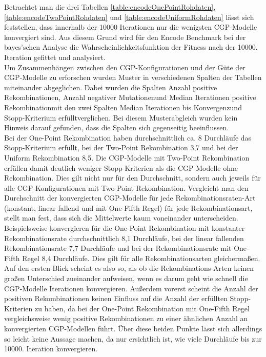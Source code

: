 Betrachtet man die drei Tabellen \ref{table:encodeOnePointRohdaten}, \ref{table:encodeTwoPointRohdaten} und \ref{table:encodeUniformRohdaten} lässt sich feststellen, dass innerhalb der 10000 Iterationen nur die wenigsten CGP-Modelle konvergiert sind.
Aus diesem Grund wird für den Encode Benchmark bei der bayes'schen Analyse die Wahrscheinlichkeitsfunktion der Fitness nach der 10000. Iteration gefittet und analysiert.\\
Um Zusammenhängen zwischen den CGP-Konfigurationen und der Güte der CGP-Modelle zu erforschen wurden Muster in verschiedenen Spalten der Tabellen miteinander abgeglichen.
Dabei wurden die Spalten \glqq Anzahl positive Rekombinationen\grqq, \glqq Anzahl negativer Mutationen\grqq\space und \glqq Median Iterationen positive Rekombination\grqq\space mit den zwei Spalten \glqq Median Iterationen bis Konvergenz\grqq\space und \glqq Stopp-Kriterium erfüllt\grqq\space verglichen.
Bei diesem Musterabgleich wurden kein Hinweis darauf gefunden, dass die Spalten sich gegenseitig beeinflussen.\\
Bei der One-Point Rekombination haben durchschnittlich ca. 8 Durchläufe das Stopp-Kri\-te\-rium erfüllt, bei der Two-Point Rekombination 3,7 und bei der Uniform Rekombination 8,5. 
Die CGP-Modelle mit Two-Point Rekombination erfüllen damit deutlich weniger Stopp-Kriterien als die CGP-Modelle ohne Rekombination.
Dies gilt nicht nur für den Durchschnitt, sondern auch jeweils für alle CGP-Konfigurationen mit Two-Point Rekombination.
Vergleicht man den Durchschnitt der konvergierten CGP-Modelle für jede Re\-kom\-bi\-na\-tions\-ra\-ten-Art (konstant, linear fallend und mit One-Fifth Regel) für jede Rekombinationsart, stellt man fest, dass sich die Mittelwerte kaum voneinander unterscheiden.
Beispielsweise konvergieren für die One-Point Rekombination mit konstanter Rekombinationsrate durchschnittlich 8,1 Durchläufe, bei der linear fallenden Rekombinationsrate 7,7 Durchläufe und bei der Rekombinationsrate mit One-Fifth Regel 8,4 Durchläufe. 
Dies gilt für alle Rekombinationsarten gleichermaßen.
Auf den ersten Blick scheint es also so, als ob die Rekombinations-Arten keinen großen Unterschied zueinander aufweisen, wenn es darum geht wie schnell die CGP-Modelle Iterationen konvergieren.
Außerdem vorerst scheint die Anzahl der positiven Rekombinationen keinen Einfluss auf die Anzahl der erfüllten Stopp-Kriterien zu haben, da bei der One-Point Rekombination mit One-Fifth Regel vergleichsweise wenig positive Rekombinationen zu einer ähnlichen Anzahl an konvergierten CGP-Modellen führt.
Über diese beiden Punkte lässt sich allerdings so leicht keine Aussage machen, da nur ersichtlich ist, wie viele Durchläufe bis zur 10000. Iteration konvergieren.
